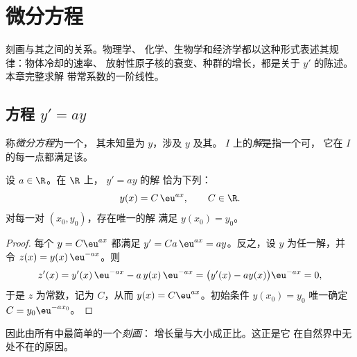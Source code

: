 \chapter{微分方程}\label{ch:g12:diffeq}

刻画与其之间的关系。物理学、
化学、生物学和经济学都以这种形式表述其规律：物体冷却的速率、
放射性原子核的衰变、种群的增长，都是关于 $y'$ 的陈述。
本章完整求解
带常系数的一阶线性。

\section{方程 \texorpdfstring{$y' = ay$}{y' = ay}}

\begin{definition}[微分方程]\label{def:g12:diffeq:ode}
称\emph{微分方程}为一个，
其未知量为 $y$，涉及 $y$ 及其。
 $I$ 上的\emph{解}是指一个可，
它在 $I$ 的每一点都满足该。
\end{definition}

\begin{theorem}[$y' = ay$ 的解]\label{thm:g12:diffeq:homogeneous}
设 $a \in \R$。在 $\R$ 上， $y' = ay$ 的解
恰为下列：
\[
y(x) = C\,\eu^{ax}, \qquad C \in \R .
\]
对每一对 $(x_0, y_0)$，存在唯一的解
满足 $y(x_0) = y_0$。
\end{theorem}

\begin{proof}
每个 $y = C\eu^{ax}$ 都满足 $y' = Ca\,\eu^{ax} = ay$。反之，设 $y$
为任一解，并令 $z(x) = y(x)\,\eu^{-ax}$。则
\[
z'(x) = y'(x)\,\eu^{-ax} - a\,y(x)\,\eu^{-ax}
= \bigl(y'(x) - a y(x)\bigr)\eu^{-ax} = 0,
\]
于是 $z$ 为常数，记为 $C$，从而 $y(x) = C\eu^{ax}$。初始条件
$y(x_0) = y_0$ 唯一确定 $C = y_0 \eu^{-a x_0}$。
\end{proof}

\begin{remark}
因此由所有中最简单的一个\emph{刻画}：
增长量与大小成正比。这正是它
在自然界中无处不在的原因。
\end{remark}

